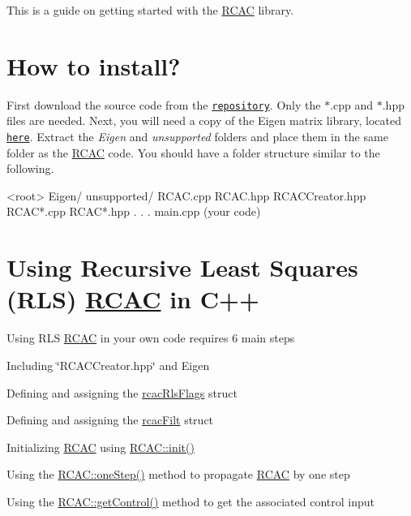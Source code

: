 This is a guide on getting started with the \hyperlink{class_r_c_a_c}{R\+C\+AC} library.

\section*{How to install? }

First download the source code from the \href{https://github.com/mohseninima/RCAC_cpp}{\tt repository}. Only the $\ast$.cpp and $\ast$.hpp files are needed. Next, you will need a copy of the Eigen matrix library, located \href{http://eigen.tuxfamily.org/}{\tt here}. Extract the {\itshape Eigen} and {\itshape unsupported} folders and place them in the same folder as the \hyperlink{class_r_c_a_c}{R\+C\+AC} code. You should have a folder structure similar to the following.


\begin{DoxyCode}
<root>
    Eigen/
    unsupported/
    RCAC.cpp
    RCAC.hpp
    RCACCreator.hpp
    RCAC*.cpp
    RCAC*.hpp
    .
    .
    .
    main.cpp (your code)
\end{DoxyCode}


\section*{Using Recursive Least Squares (R\+LS) \hyperlink{class_r_c_a_c}{R\+C\+AC} in C++ }

Using R\+LS \hyperlink{class_r_c_a_c}{R\+C\+AC} in your own code requires 6 main steps


\begin{DoxyEnumerate}
\item Including \char`\"{}\+R\+C\+A\+C\+Creator.\+hpp\char`\"{} and Eigen
\item Defining and assigning the \hyperlink{structrcac_rls_flags}{rcac\+Rls\+Flags} struct
\item Defining and assigning the \hyperlink{structrcac_filt}{rcac\+Filt} struct
\item Initializing \hyperlink{class_r_c_a_c}{R\+C\+AC} using \hyperlink{class_r_c_a_c_af7b7133b676886d5010be725291c1a1d}{R\+C\+A\+C\+::init()}
\item Using the \hyperlink{class_r_c_a_c_a956bb6a557f050d3808d5392fd3add20}{R\+C\+A\+C\+::one\+Step()} method to propagate \hyperlink{class_r_c_a_c}{R\+C\+AC} by one step
\item Using the \hyperlink{class_r_c_a_c_ad93e5753d1810d7c3b2f6fbf56857a51}{R\+C\+A\+C\+::get\+Control()} method to get the associated control input
\end{DoxyEnumerate}

